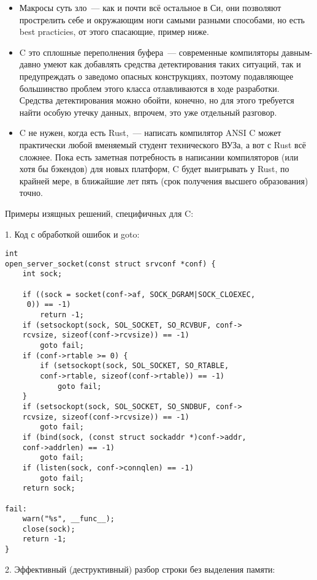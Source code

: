\documentclass[10pt, a5paper]{article}
\begin{document}
\begin{itemize}
  \item Макросы суть зло~--- как и почти всё остальное в Си, они позволяют прострелить себе и окружающим ноги самыми разными способами, но есть best practicies, от этого спасающие, пример ниже.
\end{itemize}

\begin{itemize}
  \item C это сплошные переполнения буфера~--- современные компиляторы давным-давно умеют как добавлять средства детектирования таких ситуаций, так и предупреждать о заведомо опасных конструкциях, поэтому подавляющее большинство проблем этого класса отлавливаются в ходе разработки. Средства детектирования можно обойти, конечно, но для этого требуется найти особую утечку данных, впрочем, это уже отдельный разговор.
\end{itemize}

\begin{itemize}
  \item C не нужен, когда есть Rust,~--- написать компилятор ANSI C может практически любой вменяемый студент технического ВУЗа, а вот с Rust всё сложнее. Пока есть заметная потребность в написании компиляторов (или хотя бы бэкендов) для новых платформ, C будет выигрывать у Rust, по крайней мере, в ближайшие лет пять (срок получения высшего образования) точно.
\end{itemize}

Примеры изящных решений, специфичных для C:

1. Код с обработкой ошибок и goto:

\begin{verbatim}
int
open_server_socket(const struct srvconf *conf) {
    int sock;

    if ((sock = socket(conf->af, SOCK_DGRAM|SOCK_CLOEXEC,
	 0)) == -1)
        return -1;
    if (setsockopt(sock, SOL_SOCKET, SO_RCVBUF, conf->
	rcvsize, sizeof(conf->rcvsize)) == -1)
        goto fail;
    if (conf->rtable >= 0) {
        if (setsockopt(sock, SOL_SOCKET, SO_RTABLE, 
	    conf->rtable, sizeof(conf->rtable)) == -1)
            goto fail;
    }
    if (setsockopt(sock, SOL_SOCKET, SO_SNDBUF, conf->
	rcvsize, sizeof(conf->rcvsize)) == -1)
        goto fail;
    if (bind(sock, (const struct sockaddr *)conf->addr,
	conf->addrlen) == -1)
        goto fail;
    if (listen(sock, conf->connqlen) == -1)
        goto fail;
    return sock;

fail:
    warn("%s", __func__);
    close(sock);
    return -1;
}\end{verbatim}
2. Эффективный (деструктивный) разбор строки без выделения памяти:
\end{document}
